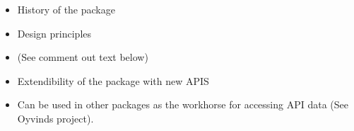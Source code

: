 \begin{itemize}
    \item History of the package
    \item Design principles
    \item (See comment out text below)
    \item Extendibility of the package with new APIS
    \item Can be used in other packages as the workhorse for accessing API data (See Oyvinds project).
\end{itemize}






